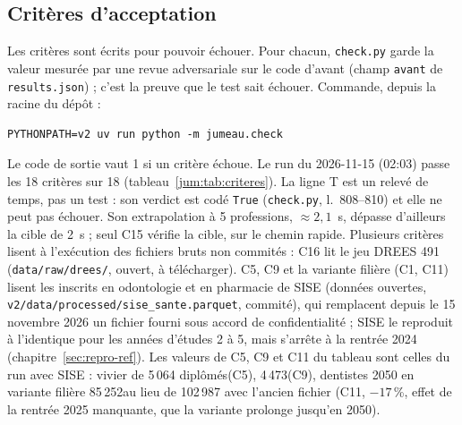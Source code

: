 \subsection{Critères d'acceptation}\label{jum:criteres}

Les critères sont écrits pour pouvoir échouer. Pour chacun, \texttt{check.py} garde la valeur mesurée par une
revue adversariale sur le code d'avant (champ \texttt{avant} de \texttt{results.json}) ; c'est la preuve que le
test sait échouer. Commande, depuis la racine du dépôt :
\begin{verbatim}
PYTHONPATH=v2 uv run python -m jumeau.check
\end{verbatim}
Le code de sortie vaut 1 si un critère échoue. Le run du 2026-11-15 (02:03) passe les 18\mesure{} critères sur
18 (tableau~\ref{jum:tab:criteres}). La ligne T est un relevé de temps, pas un test : son verdict est codé
\texttt{True} (\texttt{check.py}, l.~808--810) et elle ne peut pas échouer. Son extrapolation à 5 professions,
$\approx 2{,}1$~s\derive, dépasse d'ailleurs la cible de 2~s ; seul C15 vérifie la cible, sur le chemin rapide.
Plusieurs critères lisent à l'exécution des fichiers bruts non commités : C16 lit le jeu DREES 491
(\texttt{data/raw/drees/}, ouvert, à télécharger). C5, C9 et la variante filière (C1, C11) lisent les inscrits
en odontologie et en pharmacie de SISE (données ouvertes, \texttt{v2/data/processed/sise\_sante.parquet}, commité),
qui remplacent depuis le 15 novembre 2026 un fichier fourni sous accord de confidentialité ; SISE le reproduit à
l'identique pour les années d'études 2 à 5\mesure, mais s'arrête à la rentrée 2024 (chapitre~\ref{sec:repro-ref}).
Les valeurs de C5, C9 et C11 du tableau sont celles du run avec SISE : vivier de 5\,064 diplômés\mesure (C5),
4\,473\mesure (C9), dentistes 2050 en variante filière 85\,252\mesure au lieu de 102\,987 avec l'ancien fichier
(C11, $-17$\,\%\derive, effet de la rentrée 2025 manquante, que la variante prolonge jusqu'en 2050).

